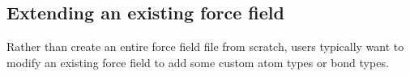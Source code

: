 \documentclass[11pt]{article}
\begin{document}








\subsection{Extending an existing force field}
\label{sec:extending_a_force_field}
Rather than create an entire force field file from scratch,
users typically want to modify an existing force field
to add some custom atom types or bond types.
\end{document}
